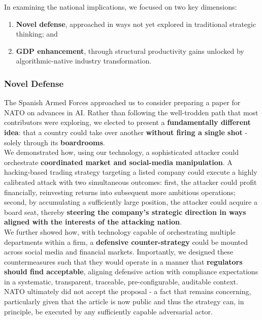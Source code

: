 \documentclass{article}
\begin{document}
In examining the national implications, we focused on two key dimensions:
\begin{enumerate}
    \item \textbf{Novel defense}, approached in ways not yet explored in traditional strategic thinking; and
    \item \textbf{GDP enhancement}, through structural productivity gains unlocked by algorithmic-native industry transformation.
\end{enumerate}

\subsubsection{Novel Defense}
\label{subsubsection: Novel Defense}

The Spanish Armed Forces approached us to consider preparing a paper for NATO on advances in AI. Rather than following the well-trodden path that most contributors were exploring, we elected to present a \textbf{fundamentally different idea}: that a country could take over another \textbf{without firing a single shot} - solely through its \textbf{boardrooms}.\\

We demonstrated how, using our technology, a sophisticated attacker could orchestrate \textbf{coordinated market and social-media manipulation}. A hacking-based trading strategy targeting a listed company could execute a highly calibrated attack with two simultaneous outcomes: first, the attacker could profit financially, reinvesting returns into subsequent more ambitious operations; second, by accumulating a sufficiently large position, the attacker could acquire a board seat, thereby \textbf{steering the company’s strategic direction in ways aligned with the interests of the attacking nation}.\\

We further showed how, with technology capable of orchestrating multiple departments within a firm, a \textbf{defensive counter-strategy} could be mounted across social media and financial markets. Importantly, we designed these countermeasures such that they would operate in a manner that \textbf{regulators should find acceptable}, aligning defensive action with compliance expectations in a systematic, transparent, traceable, pre-configurable, auditable context.\\

NATO ultimately did not accept the proposal - a fact that remains concerning, particularly given that the article is now public and thus the strategy can, in principle, be executed by any sufficiently capable adversarial actor.\\
\end{document}
